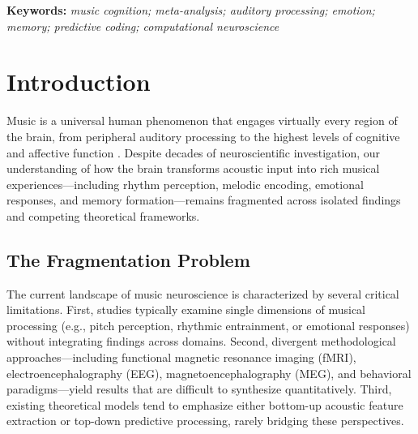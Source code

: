 \documentclass[9pt,onecolumn]{article}
\begin{document}
\begin{center}
{{        \vspace{0.5em}
        \noindent\textbf{Keywords:} \textit{music cognition; meta-analysis; auditory processing; emotion; memory; predictive coding; computational neuroscience}\\[0.8em]
        \noindent\makebox[0.95\textwidth]{\textcolor{primaryblue!80}{\rule{\textwidth}{16pt}}}
    }%
}

\vspace{0.8em}



\vspace{0.3em}


\end{center}

\vspace{1em}

\twocolumn


\section{Introduction}

Music is a universal human phenomenon that engages virtually every region of the brain, from peripheral auditory processing to the highest levels of cognitive and affective function \citep{zatorre2007, koelsch2014}. Despite decades of neuroscientific investigation, our understanding of how the brain transforms acoustic input into rich musical experiences---including rhythm perception, melodic encoding, emotional responses, and memory formation---remains fragmented across isolated findings and competing theoretical frameworks.

\vspace{-0.3em}
\subsection{The Fragmentation Problem}
\vspace{-0.2em}

The current landscape of music neuroscience is characterized by several critical limitations. First, studies typically examine single dimensions of musical processing (e.g., pitch perception, rhythmic entrainment, or emotional responses) without integrating findings across domains. Second, divergent methodological approaches---including functional magnetic resonance imaging (fMRI), electroencephalography (EEG), magnetoencephalography (MEG), and behavioral paradigms---yield results that are difficult to synthesize quantitatively. Third, existing theoretical models tend to emphasize either bottom-up acoustic feature extraction or top-down predictive processing, rarely bridging these perspectives.
\end{document}
